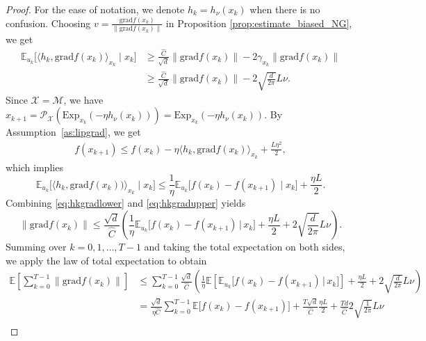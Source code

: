 \documentclass{article}
\newcommand{\rgrad}{\mathrm{grad}}
\newcommand{\pert}{\nu}
\theoremstyle{plain}
\theoremstyle{definition}
\theoremstyle{remark}
\begin{document}
\begin{proof}
For the ease of notation, we denote $h_k=h_\pert(x_k)$ when there is no confusion. Choosing $v=\frac{\rgrad f(x_k)}{\|\rgrad f(x_k)\|}$ in Proposition \ref{prop:estimate_biased_NG}, we get 
\begin{equation}\label{eq:hkgradlower}
\begin{aligned}
\mathbb{E}_{u_k}\bigl[\langle h_k, \rgrad f(x_k)\rangle_{x_k}\mid x_k\bigr]
&\geq
\frac{\hat{C}}{\sqrt{d}}
\|\rgrad f(x_k)\|
-2\gamma_{x_k}\|\rgrad f(x_k)\|\\
&\geq 
\frac{\hat{C}}{\sqrt{d}}
\|\rgrad f(x_k)\|
-2\sqrt{\frac{d}{2\pi}}{L}\pert.
\end{aligned}
\end{equation}
Since $\mathcal{X}=\mathcal{M}$, we have $x_{k+1} = \mathcal{P}_{\mathcal{X}}\left(\mathrm{Exp}_{x_k}(- \eta h_\pert(x_k))\right) = \mathrm{Exp}_{x_k}(- \eta h_\pert(x_k)).$ 
By Assumption~\ref{as:lipgrad}, we get 
\begin{align*}
    f(x_{k+1})\leq f(x_k)-\eta\langle h_k,\rgrad f(x_k)\rangle_{x_k}+\frac{L\eta^2}{2},
\end{align*}
which implies 
\begin{equation}\label{eq:hkgradupper}
\mathbb{E}_{u_k}\bigl[\langle h_k, \rgrad f(x_k))\rangle_{x_k}\mid x_k\bigr]\leq \frac{1}{\eta }\mathbb{E}_{u_k}\bigl[f(x_k)-f(x_{k+1})\mid x_k\bigr] + \frac{\eta{L}}{2}.
\end{equation} 
Combining \eqref{eq:hkgradlower} and \eqref{eq:hkgradupper} yields
\begin{equation}\label{eq:combine_hkgrad_bounds}
    \|\rgrad f(x_k)\| \leq \frac{\sqrt{d}}{\hat{C}}\left(\frac{1}{\eta }\mathbb{E}_{u_k}\bigl[f(x_k)-f(x_{k+1})\,\big|\,x_k\bigr] + \frac{\eta{L}}{2}+2\sqrt{\frac{d}{2\pi}}{L}\pert\right).
\end{equation}
Summing over $k=0,1, \ldots, T-1$ and taking the total expectation on both sides, we apply the law of total expectation to obtain
\begin{equation}\label{eq:beta_smooth_inequality}
\begin{aligned}
    \mathbb{E}\left[\sum_{k=0}^{T-1}\|\rgrad f(x_k)\|\right] 
    &\leq \sum_{k=0}^{T-1}\frac{\sqrt{d}}{\hat{C}}\left(\frac{1}{\eta }\mathbb{E}\left[\mathbb{E}_{u_k}\bigl[f(x_k)-f(x_{k+1})\,\big|\,x_k\bigr]\right] + \frac{\eta{L}}{2}+2\sqrt{\frac{d}{2\pi}}{L}\pert\right)\\
    &= \frac{\sqrt{d}}{\eta \hat{C} }\sum_{k=0}^{T-1}\mathbb{E}\bigl[f(x_k)-f(x_{k+1})\bigr] +\frac{T\sqrt{d}}{\hat{C}}\frac{\eta{L}}{2}+\frac{Td}{\hat{C}}2\sqrt{\frac{1}{2\pi}}{L}\pert\\

\end{aligned}
\end{equation}
\end{proof}
\end{document}
